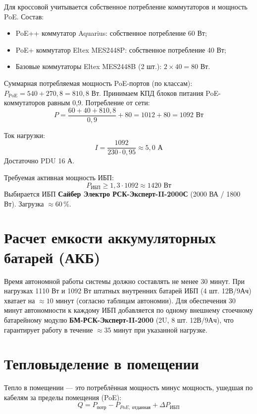 \documentclass{bmstu}
\begin{document}
Для кроссовой учитывается собственное потребление коммутаторов и мощность PoE.
Состав:
\begin{itemize}
    \item PoE++ коммутатор Aquarius: собственное потребление 60 Вт;
    \item PoE+ коммутатор Eltex MES2448P: собственное потребление 40 Вт;
    \item Базовые коммутаторы Eltex MES2448B (2 шт.): $2 \times 40 = 80$ Вт.
\end{itemize}
Суммарная потребляемая мощность PoE-портов (по классам): $P_{\text{PoE}} = 540 + 270{,}8 = 810{,}8$ Вт.
Принимаем КПД блоков питания PoE-коммутаторов равным 0,9. Потребление от сети:
\begin{equation}
    P = \frac{60 + 40 + 810{,}8}{0{,}9} + 80 = 1012 + 80 = 1092 \text{ Вт}
\end{equation}

Ток нагрузки:
\begin{equation}
    I = \frac{1092}{230 \cdot 0{,}95} \approx 5{,}0 \text{ А}
\end{equation}
Достаточно PDU 16 А.

Требуемая активная мощность ИБП:
\begin{equation}
    P_{\text{ИБП}} \ge 1{,}3 \cdot 1092 \approx 1420 \text{ Вт}
\end{equation}
Выбирается ИБП \textbf{Сайбер Электро РСК-Эксперт-II-2000С} (2000 ВА / 1800 Вт). Загрузка $\approx 60\,\%$.

\section{Расчет емкости аккумуляторных батарей (АКБ)}

Время автономной работы системы должно составлять не менее 30 минут. При нагрузках 1110 Вт и 1092 Вт штатных внутренних батарей ИБП (4 шт. 12В/9Ач) хватает на $\approx 10$ минут (согласно таблицам автономии). Для обеспечения 30 минут автономности к каждому ИБП добавляется по одному внешнему стоечному батарейному модулю \textbf{БМ-РСК-Эксперт-II-2000} (2U, 8 шт. 12В/9Ач), что гарантирует работу в течение $\approx 35$ минут при указанной нагрузке.

\section{Тепловыделение в помещении}

Тепло в помещении — это потреблённая мощность минус мощность, ушедшая по кабелям за пределы помещения (PoE):
\begin{equation}
    Q = P_{\text{потр}} - P_{PoE,\ \text{отданная}} + \Delta P_{\text{ИБП}}
\end{equation}
\end{document}
